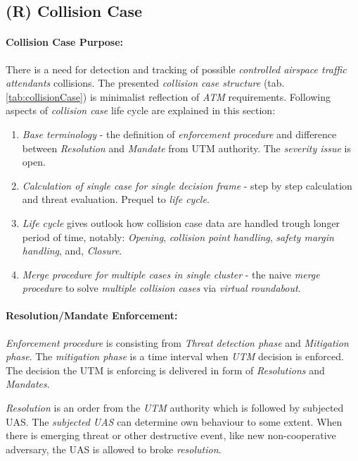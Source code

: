 \subsection{(R) Collision Case}\label{sec:collisionCase}


\paragraph{Collision Case Purpose:} There is a need for detection and tracking of possible \emph{controlled airspace traffic attendants} collisions.  The presented \emph{collision case structure} (tab. \ref{tab:collisionCase}) is minimalist reflection of \emph{ATM} requirements. Following aspects of  \emph{collision case} life cycle are explained in this section:
\begin{enumerate}
    \item \emph{Base terminology} - the definition of \emph{enforcement procedure} and difference between \emph{Resolution} and \emph{Mandate} from UTM authority. The \emph{severity issue} is open.
    
    \item \emph{Calculation of single case for single decision frame} - step by step calculation and threat evaluation. Prequel to \emph{life cycle}.
    
    \item \emph{Life cycle} gives outlook how collision case data are handled trough longer period of time, notably: \emph{Opening}, \emph{collision point handling}, \emph{safety margin handling}, and, \emph{Closure}.
    
    \item \emph{Merge procedure for multiple cases in single cluster} - the naive \emph{merge procedure} to solve \emph{multiple collision cases} via \emph{virtual roundabout}.
\end{enumerate}


\paragraph{Resolution/Mandate Enforcement:}
\emph{Enforcement procedure} is consisting from \emph{Threat detection phase} and \emph{Mitigation phase}. The \emph{mitigation phase} is a time interval when \emph{UTM} decision is enforced. The decision the UTM is enforcing is delivered in form of \emph{Resolutions} and \emph{Mandates}.


\emph{Resolution} is an order from the \emph{UTM} authority which is followed by subjected UAS. The \emph{subjected UAS} can determine own behaviour to some extent. When there is emerging threat or other destructive event, like new non-cooperative adversary, the UAS is allowed to broke \emph{resolution}.  

